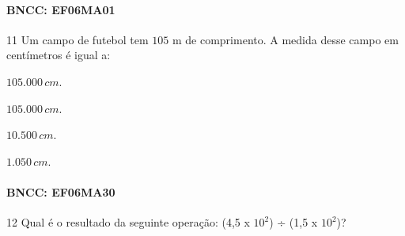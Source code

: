 \paragraph{BNCC: EF06MA01 }


\num{11} Um campo de futebol tem $105$ m de comprimento. A medida desse campo em centímetros é igual a:

\begin{escolha}
\item $105.000\,cm$.
\item $105.000\,cm$.
\item $10.500\,cm$.
\item $1.050\,cm$.
\end{escolha}

\paragraph{BNCC: EF06MA30}


\num{12} Qual é o resultado da seguinte operação: (4,5 x $10^2$) ÷ (1,5 x $10^2$)?


